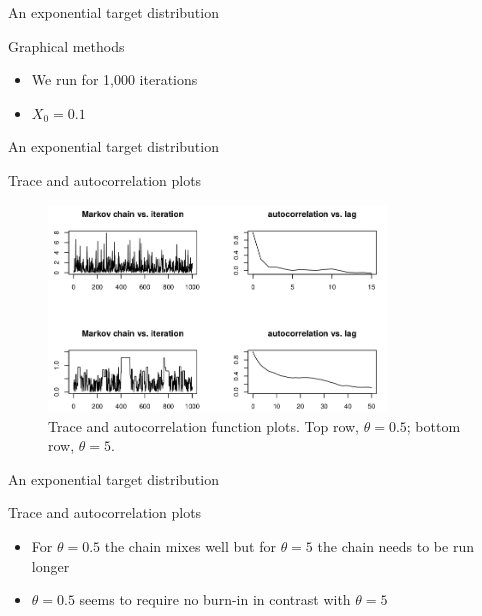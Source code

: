 \documentclass{beamer}
\begin{document}
\begin{frame}{An exponential target distribution}
  \begin{block}{Graphical methods}
    \begin{itemize}
      \item We run for 1,000 iterations
      \item $X_0 = 0.1$
    \end{itemize}
  \end{block}
\end{frame}

\begin{frame}{An exponential target distribution}
  \begin{block}{Trace and autocorrelation plots}
    \begin{figure}[h]
      \includegraphics[width=0.8\textwidth]{example1_trace_autocorrellation_plot}
      \caption{Trace and autocorrelation function plots. Top row, $\theta = 0.5$; bottom row, $\theta = 5$.}
    \end{figure}
  \end{block}
\end{frame}

\begin{frame}{An exponential target distribution}
  \begin{block}{Trace and autocorrelation plots}
    \begin{itemize}
      \item For $\theta = 0.5$ the chain mixes well but for $\theta = 5$ the chain needs to be run longer
      \item $\theta = 0.5$ seems to require no burn-in in contrast with $\theta = 5$
    \end{itemize}
  \end{block}
\end{frame}
\end{document}
